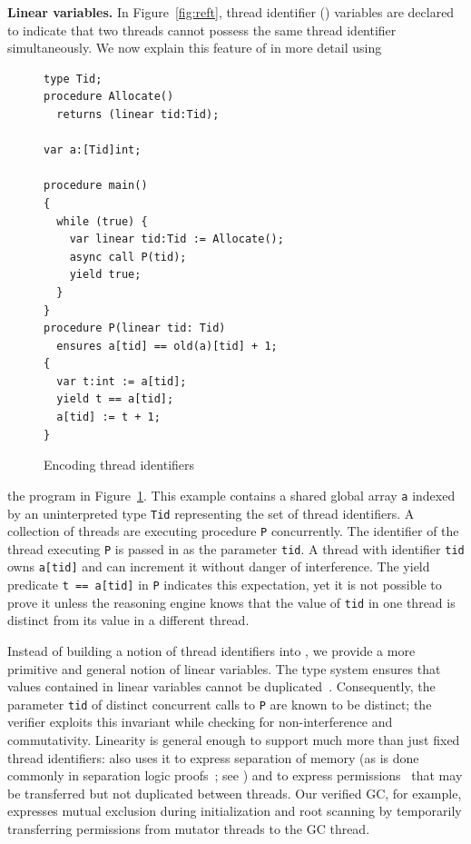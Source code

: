{\bf Linear variables.}
In Figure~\ref{fig:reft}, thread identifier () variables are declared  
to indicate that two threads cannot possess the same thread identifier simultaneously.
We now explain this feature of \civl in more detail using 
\begin{figure}
\vspace*{-1cm}
{\scriptsize
\begin{verbatim}
type Tid;
procedure Allocate() 
  returns (linear tid:Tid);

var a:[Tid]int;

procedure main()
{
  while (true) {
    var linear tid:Tid := Allocate();
    async call P(tid);
    yield true;
  }
}
procedure P(linear tid: Tid)
  ensures a[tid] == old(a)[tid] + 1;
{
  var t:int := a[tid];
  yield t == a[tid];
  a[tid] := t + 1;
}
\end{verbatim}
}
\vspace*{-0.3cm}
 \caption{Encoding thread identifiers}
\label{fig:ex5}
\end{figure}
the program in Figure~\ref{fig:ex5}.
This example contains a shared global array {\tt a} indexed by an uninterpreted type {\tt Tid} 
representing the set of thread identifiers.
A collection of threads are executing procedure {\tt P} concurrently.
The identifier of the thread executing {\tt P} is passed in as the parameter {\tt tid}.
A thread with identifier {\tt tid} owns {\tt a[tid]} and can increment it without danger of interference.
The yield predicate {\tt t == a[tid]} in {\tt P} indicates this expectation, yet it is not possible to prove it 
unless the reasoning engine knows that the value of {\tt tid} in one thread is distinct 
from its value in a different thread.

Instead of building a notion of thread identifiers into \civl, we provide a more 
primitive and general notion of linear variables.
The \civl type system ensures that values contained in linear variables cannot be duplicated~\cite{Wadler90lineartypes}.
Consequently, the parameter {\tt tid} of distinct concurrent calls to {\tt P} are known to be distinct;
the \civl verifier exploits this invariant while checking for non-interference and commutativity.
Linearity is general enough to support much more than just fixed thread identifiers:
\civl also uses it to express separation of memory (as is done
commonly in separation logic proofs~\cite{Reynolds02}; see \cite{LahiriQW11})
and to express permissions~\cite{boyland:03fractions} that may be transferred but not duplicated between threads.
Our verified GC, for example, expresses mutual exclusion during initialization and root scanning by temporarily transferring permissions from mutator threads to the GC thread.

